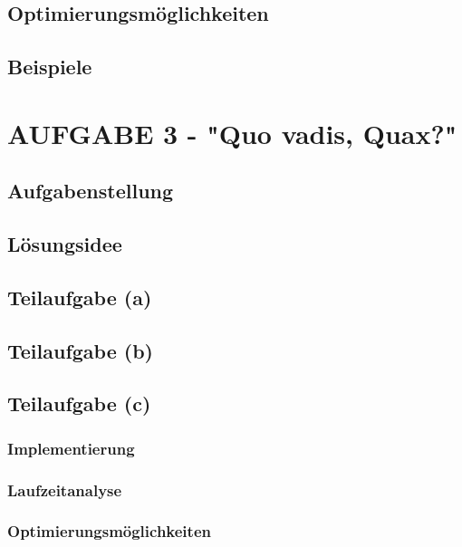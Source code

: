 \documentclass[a4paper,12pt]{article}
\begin{document}
\subsection{Optimierungsmöglichkeiten}

\subsection{Beispiele}



\newpage
\section{AUFGABE 3 - "Quo vadis, Quax?"}



\subsection{Aufgabenstellung}

\subsection{Lösungsidee}

\subsection{Teilaufgabe (a)}

\subsection{Teilaufgabe (b)}

\subsection{Teilaufgabe (c)}
\subsubsection{Implementierung}
\subsubsection{Laufzeitanalyse}
\subsubsection{Optimierungsmöglichkeiten}
\end{document}
